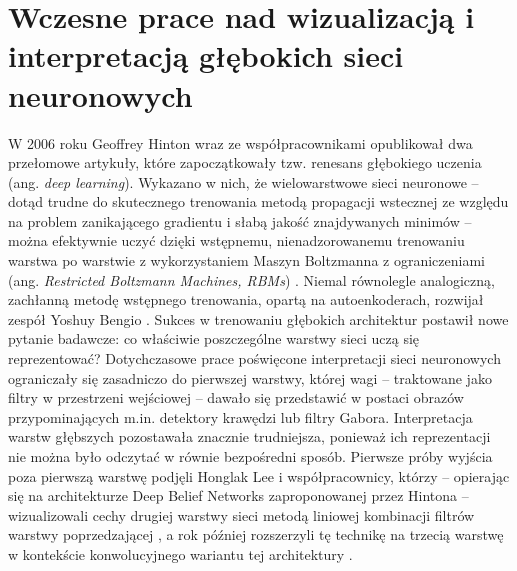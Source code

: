 \section{Wczesne prace nad wizualizacją i interpretacją głębokich sieci neuronowych} 
\label{sec:wczesne_prace_wizualizacja}
W 2006 roku Geoffrey Hinton wraz ze współpracownikami opublikował dwa przełomowe artykuły, które zapoczątkowały tzw. renesans głębokiego uczenia (ang. \textit{deep learning}). Wykazano w nich, że wielowarstwowe sieci neuronowe -- dotąd trudne do skutecznego trenowania metodą propagacji wstecznej ze względu na problem zanikającego gradientu i słabą jakość znajdywanych minimów -- można efektywnie uczyć dzięki wstępnemu, nienadzorowanemu trenowaniu warstwa po warstwie z wykorzystaniem Maszyn Boltzmanna z ograniczeniami (ang. \textit{Restricted Boltzmann Machines, RBMs}) \cite{hinton_reducing_the_dimensionality_of_data} \cite{hinton_a_fast_learning_algorithm_for_deep_belief_nets}. Niemal równolegle analogiczną, zachłanną metodę wstępnego trenowania, opartą na autoenkoderach, rozwijał zespół Yoshuy Bengio \cite{lamblin_greedy_layer_wise_training_of_deep_networks}. \newline
Sukces w trenowaniu głębokich architektur postawił nowe pytanie badawcze: co właściwie poszczególne warstwy sieci uczą się reprezentować? Dotychczasowe prace poświęcone interpretacji sieci neuronowych ograniczały się zasadniczo do pierwszej warstwy, której wagi -- traktowane jako filtry w przestrzeni wejściowej -- dawało się przedstawić w postaci obrazów przypominających m.in. detektory krawędzi lub filtry Gabora. Interpretacja warstw głębszych pozostawała znacznie trudniejsza, ponieważ ich reprezentacji nie można było odczytać w równie bezpośredni sposób. \newline
Pierwsze próby wyjścia poza pierwszą warstwę podjęli Honglak Lee i współpracownicy, którzy -- opierając się na architekturze Deep Belief Networks zaproponowanej przez Hintona -- wizualizowali cechy drugiej warstwy sieci metodą liniowej kombinacji filtrów warstwy poprzedzającej \cite{lee_sparse_deep_belief_net_model_for_visual_area_v2}, a rok później rozszerzyli tę technikę na trzecią warstwę w kontekście konwolucyjnego wariantu tej architektury \cite{lee_convolutional_deep_belief_networks_for_scalable_unsupervised_learning}. \newline
